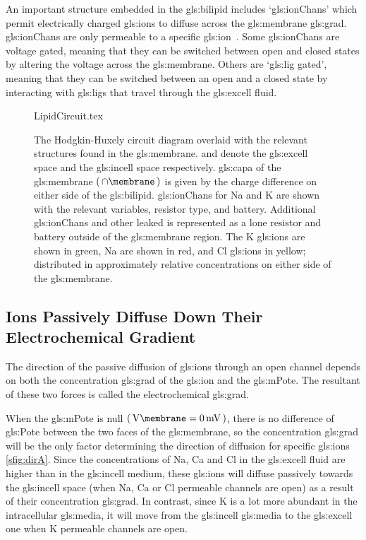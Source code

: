 \documentclass[class={.NoTouch/myProject}, crop=false]{standalone}
\begin{document}
An important structure embedded in the \gls{gls:bilipid} includes `\glspl{gls:ionChan}' which permit electrically charged \glspl{gls:ion} to diffuse across the \gls{gls:membrane} \gls{gls:grad}. \Glspl{gls:ionChan} are only permeable to a specific \gls{gls:ion}~\cite{}. Some \glspl{gls:ionChan} are voltage gated, meaning that they can be switched between open and closed states by altering the voltage across the \gls{gls:membrane}. 
Others are `\gls{gls:lig} gated', meaning that they can be switched between an open and a closed state by interacting with \glspl{gls:lig} that travel through the \gls{gls:excell} fluid. 

\vspace{1em}

\begin{figure}[H]
    \centering
    {LipidCircuit.tex}
    \caption{The Hodgkin-Huxely circuit diagram overlaid with the relevant structures found in the \gls{gls:membrane}.  and  denote the \gls{gls:excell} space and the \gls{gls:incell} space respectively. \Gls{gls:capa} of the \gls{gls:membrane} \(\br{\unit{\cap\membrane}}\) is given by the charge difference on either side of the \gls{gls:bilipid}. \Glspl{gls:ionChan} for \gls{Na} and \gls{K} are shown with the relevant variables, resistor type, and battery. Additional \glspl{gls:ionChan} and other leaked is represented as a lone resistor and battery outside of the \gls{gls:membrane} region. The \gls{K} \glspl{gls:ion} are shown in green, \gls{Na} are shown in red, and \gls{Cl} \glspl{gls:ion} in yellow; distributed in approximately relative concentrations on either side of the \gls{gls:membrane}. }\label{fig:MembraneCircut}
\end{figure}


\subsection{Ions Passively Diffuse Down Their Electrochemical Gradient}
The direction of the passive diffusion of \glspl{gls:ion} through an open channel depends on both the concentration \gls{gls:grad} of the \gls{gls:ion} and the \gls{gls:mPote}. The resultant of these two forces is called the electrochemical \gls{gls:grad}.

When  the \gls{gls:mPote} is null \(\br{\unit{\V\membrane}=\qty{0}{\mV}}\), there is no difference of \gls{gls:Pote} between the two faces of the \gls{gls:membrane}, so the concentration \gls{gls:grad} will be the only factor determining the direction of diffusion for specific \glspl{gls:ion} \cref{sfig:dirA}. Since the concentrations of \gls{Na}, \gls{Ca} and \gls{Cl}  in the \gls{gls:excell} fluid are higher than in the  \gls{gls:incell} medium, these \glspl{gls:ion} will diffuse passively towards the \gls{gls:incell} space (when \gls{Na}, \gls{Ca} or \gls{Cl} permeable channels are open) as a result of their concentration \gls{gls:grad}. In contrast, since \gls{K} is a lot more abundant in the intracellular \gls{gls:media}, it will move from the \gls{gls:incell} \gls{gls:media} to the \gls{gls:excell} one when \gls{K} permeable channels are open. 
\end{document}
